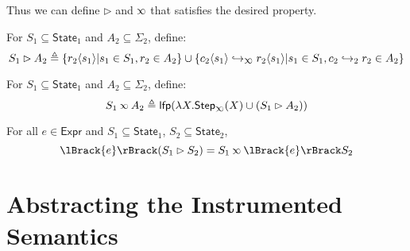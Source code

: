 \documentclass[acmsmall,screen,review]{acmart}\settopmatter{printfolios=true,printccs=false,printacmref=false}
\theoremstyle{acmdefinition}
\newcommand*{\Expr}{\mathsf{Expr}}
\newcommand*{\config}{c}
\newcommand*{\rightst}{r}
\newcommand*{\State}{\mathsf{State}}
\newcommand*{\lfp}{\mathsf{lfp}}
\newcommand*{\Step}{\mathsf{Step}}
\newcommand*{\semarrow}{\hookrightarrow}
\newcommand*{\semlink}{\mathbin{\rotatebox[origin=c]{180}{$\propto$}}}
\newcommand*{\sembracket}[1]{\lBrack{#1}\rBrack}
\newcommand*{\inject}[2]{{#2}\langle{#1}\rangle}
\begin{document}
Thus we can define $\rhd$ and $\semlink$ that satisfies the desired property.
\begin{definition}[Injection]
  For $S_1\subseteq\State_1$ and $A_2\subseteq\Sigma_2$, define:
  \[
    S_1\rhd A_2\triangleq\{\inject{s_1}{\rightst_2}|s_1\in S_1,\rightst_2\in A_2\}\cup\{\inject{s_1}{\config_2}\semarrow_{\semlink}\inject{s_1}{\rightst_2}|s_1\in S_1,\config_2\semarrow_2\rightst_2\in A_2\}
  \]
\end{definition}
\begin{definition}
  For $S_1\subseteq\State_1$ and $A_2\subseteq\Sigma_2$, define:
  \[
    S_1\semlink A_2\triangleq\lfp(\lambda X.\Step_{\semlink}(X)\cup(S_1\rhd A_2))
  \]
\end{definition}
\begin{theorem}[Advance]
  For all $e\in\Expr$ and $S_1\subseteq\State_1$, $S_2\subseteq\State_2$,
  \[
    \sembracket{e}(S_1\rhd S_2)=S_1\semlink\sembracket{e}S_2
  \]
\end{theorem}

\section{Abstracting the Instrumented Semantics}
\end{document}
